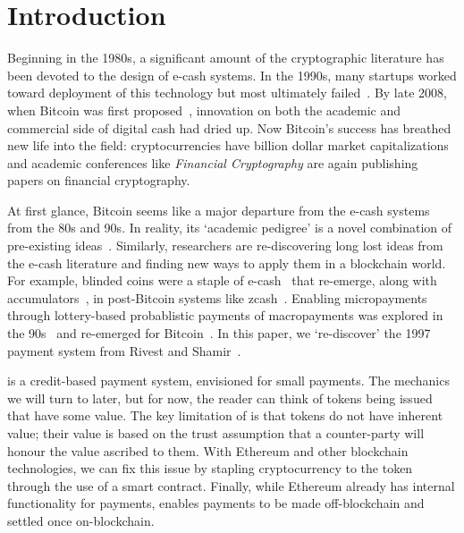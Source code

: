 

\section{Introduction}

Beginning in the 1980s, a significant amount of the cryptographic literature has been devoted to the design of e-cash systems. In the 1990s, many startups worked toward deployment of this technology but most ultimately failed~\cite{NBFMG16}. By late 2008, when Bitcoin was first proposed~\cite{Nak08}, innovation on both the academic and commercial side of digital cash had dried up. Now Bitcoin's success has breathed new life into the field: cryptocurrencies have billion dollar market capitalizations and academic conferences like \textit{Financial Cryptography} are again publishing papers on financial cryptography. 

At first glance, Bitcoin seems like a major departure from the e-cash systems from the 80s and 90s. In reality, its `academic pedigree' is a novel combination of pre-existing ideas~\cite{NaCl17}. Similarly, researchers are re-discovering long lost ideas from the e-cash literature and finding new ways to apply them in a blockchain world. For example, blinded coins were a staple of e-cash~\cite{Cha82} that re-emerge, along with accumulators~\cite{SaTa99}, in post-Bitcoin systems like zcash~\cite{MGGR13,SCG+14}. Enabling micropayments through lottery-based probablistic payments of macropayments was explored in the 90s~\cite{Riv97,Whe97,JaOd97} and re-emerged for Bitcoin~\cite{Pash15}. In this paper, we `re-discover' the 1997 payment system \pw from Rivest and Shamir~\cite{RS96}. 


\pw is a credit-based payment system, envisioned for small payments. The mechanics we will turn to later, but for now, the reader can think of tokens being issued that have some value. The key limitation of \pw is that tokens do not have inherent value; their value is based on the trust assumption that a counter-party will honour the value ascribed to them. With Ethereum and other blockchain technologies, we can fix this issue by stapling cryptocurrency to the token through the use of a smart contract. Finally, while Ethereum already has internal functionality for payments, \ew enables payments to be made off-blockchain and settled once on-blockchain.

